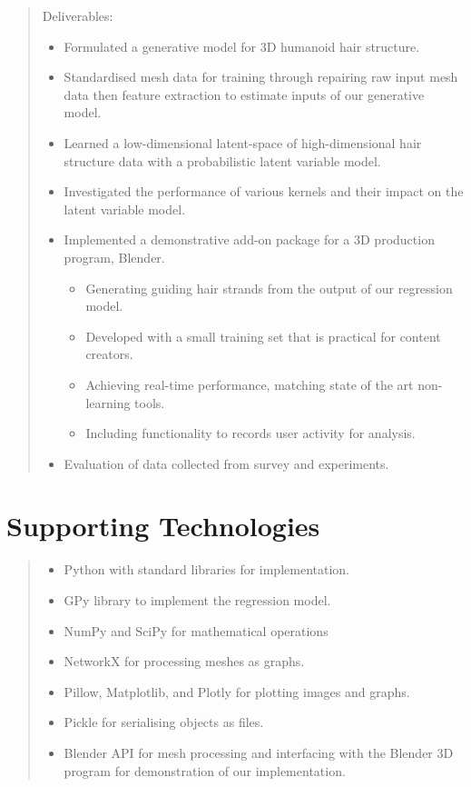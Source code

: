 \documentclass[ %
author={Dillon Keith Diep},
supervisor={Dr. Carl Henrik Ek},
degree={MEng},
title={ART-CG Hair:},
subtitle={Assisted Real-time Content Generation of Stylised Virtual Hair},
type={Research},
year={2017} ]{dissertation}
\begin{document}
\begin{quote}
	Deliverables:
	\begin{itemize}
		\item Formulated a generative model for 3D humanoid hair structure.
		\item Standardised mesh data for training through repairing raw input mesh data then feature extraction to estimate inputs of our generative model.
		\item Learned a low-dimensional latent-space of high-dimensional hair structure data with a probabilistic latent variable model.
		\item Investigated the performance of various kernels and their impact on the latent variable model.
		\item Implemented a demonstrative add-on package for a 3D production program, Blender.
		\begin{itemize}
			\item Generating guiding hair strands from the output of our regression model.
			\item Developed with a small training set that is practical for content creators.
			\item Achieving real-time performance, matching state of the art non-learning tools.
			\item Including functionality to records user activity for analysis.
		\end{itemize}
		\item Evaluation of data collected from survey and experiments.
	\end{itemize}
\end{quote}


\chapter*{Supporting Technologies}

\begin{quote}
	\noindent
	\begin{itemize}
		\item Python with standard libraries for implementation.
		\item GPy library to implement the regression model.
		\item NumPy and SciPy for mathematical operations
		\item NetworkX for processing meshes as graphs.
		\item Pillow, Matplotlib, and Plotly for plotting images and graphs.
		\item Pickle for serialising objects as files.
		\item Blender API for mesh processing and interfacing with the Blender 3D program for demonstration of our implementation.
	\end{itemize}
\end{quote}
\end{document}
